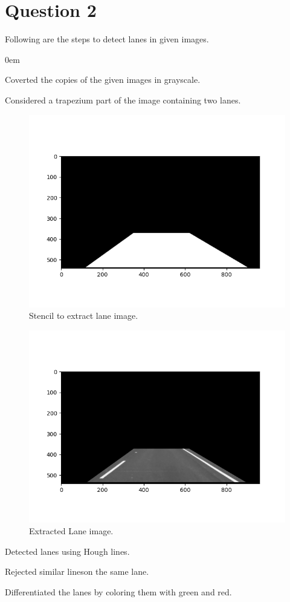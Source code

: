 \documentclass[11pt]{article}
\begin{document}
\section{Question 2}
Following are the steps to detect lanes in given images.
\begin{description}
\addtolength{\itemindent}{0.80cm}
\itemsep0em 
\item[1.] Coverted the copies of the given images in grayscale.
\item[2.] Considered a trapezium part of the image containing two lanes.
\begin{figure}[H]
  \centering
	\includegraphics[height=0.7\textwidth]{Q2_stencil}
	\caption{Stencil to extract lane image.} 
\end{figure}
\begin{figure}[H]
  \centering
	\includegraphics[height=0.7\textwidth]{Q2_gray}
	\caption{Extracted Lane image.} 
\end{figure}
\item[3.] Detected lanes using Hough lines.
\item[4.] Rejected similar lineson the same lane.
\item[5.] Differentiated the lanes by coloring them with green and red.


\end{description}
\end{document}
